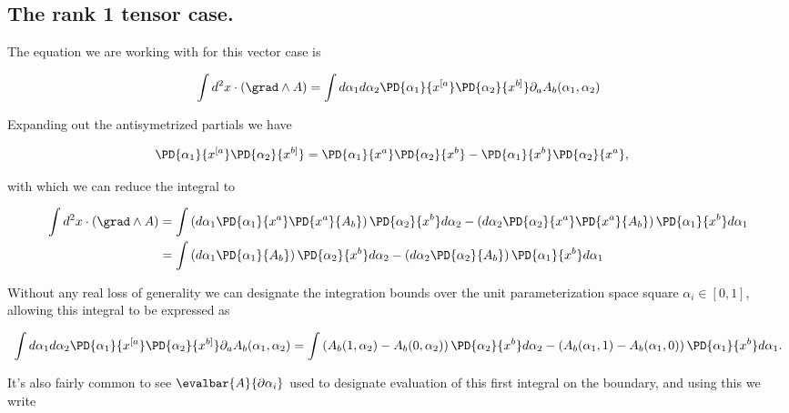 \subsection{The rank 1 tensor case.}

The equation we are working with for this vector case is

\begin{equation}\label{eqn:stokesTensor:n}
\int d^2 x \cdot (\grad \wedge A) =
\int
d{\alpha_1} d{\alpha_2}
\PD{\alpha_1}{x^{[a}}
\PD{\alpha_2}{x^{b]}}
\partial_a A_{b}(\alpha_1, \alpha_2)
\end{equation}

Expanding out the antisymetrized partials we have

\begin{align*}
\PD{\alpha_1}{x^{[a}}
\PD{\alpha_2}{x^{b]}}
&=
\PD{\alpha_1}{x^{a}}
\PD{\alpha_2}{x^{b}}
-
\PD{\alpha_1}{x^{b}}
\PD{\alpha_2}{x^{a}},
\end{align*}

with which we can reduce the integral to

\begin{align*}
\int d^2 x \cdot (\grad \wedge A)
&=
\int
\left( d{\alpha_1}
\PD{\alpha_1}{x^{a}}
\PD{x^a}{A_{b}} \right)
\PD{\alpha_2}{x^{b}} d{\alpha_2}
-
\left( d{\alpha_2}
\PD{\alpha_2}{x^{a}}
\PD{x^a}{A_{b}} \right)
\PD{\alpha_1}{x^{b}} d{\alpha_1} \\
&=
\int
\left( d\alpha_1 \PD{\alpha_1}{A_b} \right)
\PD{\alpha_2}{x^{b}} d{\alpha_2}
-
\left( d\alpha_2 \PD{\alpha_2}{A_b} \right)
\PD{\alpha_1}{x^{b}} d{\alpha_1} \\
\end{align*}

Without any real loss of generality we can designate the integration bounds over the unit parameterization space square $\alpha_i \in [0,1]$, allowing this integral to be expressed as

\begin{equation}\label{eqn:stokesTensor:n}
\int
d{\alpha_1} d{\alpha_2}
\PD{\alpha_1}{x^{[a}}
\PD{\alpha_2}{x^{b]}}
\partial_a A_{b}(\alpha_1, \alpha_2)
=
\int
\left( A_b(1, \alpha_2) - A_b(0, \alpha_2) \right)
\PD{\alpha_2}{x^{b}} d{\alpha_2}
-
\left( A_b(\alpha_1, 1) - A_b(\alpha_1, 0) \right)
\PD{\alpha_1}{x^{b}} d{\alpha_1}.
\end{equation}

It's also fairly common to see $\evalbar{A}{\partial \alpha_i}$ used to designate evaluation of this first integral on the boundary, and using this we write

